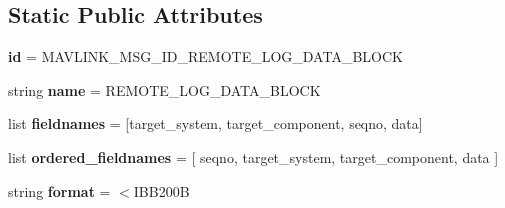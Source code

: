 \subsection*{Static Public Attributes}
\begin{DoxyCompactItemize}
\item 
\mbox{\label{classpymavlink_1_1dialects_1_1v10_1_1MAVLink__remote__log__data__block__message_aef2a4ed387fd1126fd0d4bab28d96e7d}} 
{\bfseries id} = M\+A\+V\+L\+I\+N\+K\+\_\+\+M\+S\+G\+\_\+\+I\+D\+\_\+\+R\+E\+M\+O\+T\+E\+\_\+\+L\+O\+G\+\_\+\+D\+A\+T\+A\+\_\+\+B\+L\+O\+CK
\item 
\mbox{\label{classpymavlink_1_1dialects_1_1v10_1_1MAVLink__remote__log__data__block__message_af9aece7cf741ece6f890f8a2ada6c686}} 
string {\bfseries name} = \textquotesingle{}R\+E\+M\+O\+T\+E\+\_\+\+L\+O\+G\+\_\+\+D\+A\+T\+A\+\_\+\+B\+L\+O\+CK\textquotesingle{}
\item 
\mbox{\label{classpymavlink_1_1dialects_1_1v10_1_1MAVLink__remote__log__data__block__message_a3a8b0ee3950040c706f3340a35b93a54}} 
list {\bfseries fieldnames} = \mbox{[}\textquotesingle{}target\+\_\+system\textquotesingle{}, \textquotesingle{}target\+\_\+component\textquotesingle{}, \textquotesingle{}seqno\textquotesingle{}, \textquotesingle{}data\textquotesingle{}\mbox{]}
\item 
\mbox{\label{classpymavlink_1_1dialects_1_1v10_1_1MAVLink__remote__log__data__block__message_a4f234805b6c5540ee2ecaba0332e6323}} 
list {\bfseries ordered\+\_\+fieldnames} = \mbox{[} \textquotesingle{}seqno\textquotesingle{}, \textquotesingle{}target\+\_\+system\textquotesingle{}, \textquotesingle{}target\+\_\+component\textquotesingle{}, \textquotesingle{}data\textquotesingle{} \mbox{]}
\item 
\mbox{\label{classpymavlink_1_1dialects_1_1v10_1_1MAVLink__remote__log__data__block__message_ae978fe8cea4073b511717dce021e28e7}} 
string {\bfseries format} = \textquotesingle{}$<$I\+B\+B200B\textquotesingle{}

\end{DoxyCompactItemize}
